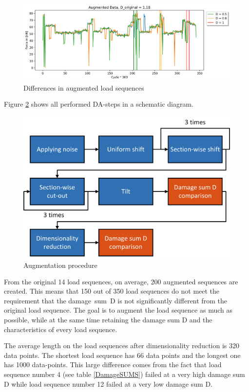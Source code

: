\begin{figure}[H]
	\centering
	\includegraphics[width=1\linewidth]{IMGs/Augmented_5.png}
	\caption{Differences in augmented load sequences}
	\label{fig:3in1}
\end{figure}

Figure \ref{fig:allDA} shows all performed DA-steps in a schematic diagram.

\begin{figure}[H]
	\centering
	\includegraphics[width=0.7\linewidth]{IMGs/Augmentation.png}
	\caption{Augmentation procedure}
	\label{fig:allDA}
\end{figure}

From the original 14 load sequences, on average, 200 augmented sequences are created. This means that 150 out of 350 load sequences do not meet the requirement that the damage~sum~D is not significantly different from the original load sequence. 
The goal is to augment the load sequence as much as possible, while at the same time retaining the damage sum D and the characteristics of every load sequence. 


The average length on the load sequences after dimensionality reduction is 320 data points. The shortest load sequence has 66 data points and the longest one has 1000 data-points. This large difference comes from the fact that load sequence number 4 (see table \ref{DamageSUMS}) failed at a very high damage sum D while load sequence number 12 failed at a very low damage sum D.

